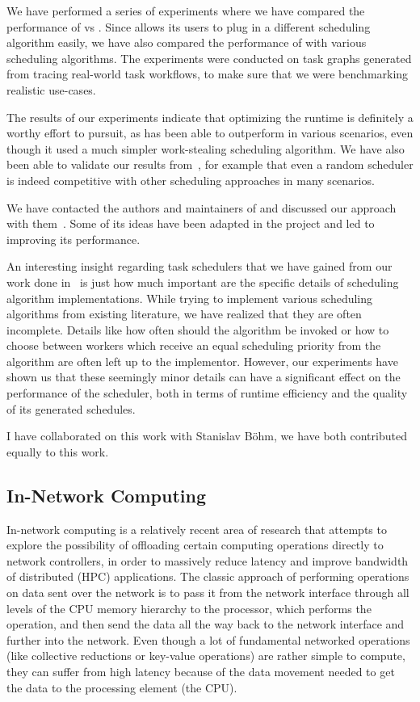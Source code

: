 We have performed a series of experiments where we have compared the performance of \rsds{} vs
\dask{}. Since \rsds{} allows its users to plug in a different scheduling algorithm easily, we
have also compared the performance of \rsds{} with various scheduling algorithms. The experiments
were conducted on task graphs generated from tracing real-world \dask{} task workflows, to make
sure that we were benchmarking realistic use-cases.

The results of our experiments indicate that optimizing the runtime is definitely a worthy effort
to pursuit, as \rsds{} has been able to outperform \dask{} in various scenarios, even though it
used a much simpler work-stealing scheduling algorithm. We have also been able to validate our
results from~\cite{estee}, for example that even a random scheduler is indeed competitive with
other scheduling approaches in many scenarios.

We have contacted the authors and maintainers of \dask{} and discussed our \rsds{} approach with
them~.
Some of its ideas have been adapted in the \dask{} project and led to improving its performance.

An interesting insight regarding task schedulers that we have gained from our work done
in~\cite{estee,rsds} is just how much important are the specific details of scheduling algorithm
implementations. While trying to implement various scheduling algorithms from existing
literature, we have realized that they are often incomplete. Details like how
often should the algorithm be invoked or how to choose between workers which receive an equal
scheduling priority from the algorithm are often left up to the implementor. However, our
experiments have shown us that these seemingly minor details can have a significant effect on
the performance of the scheduler, both in terms of runtime efficiency and the quality of its
generated schedules.

I have collaborated on this work with Stanislav Böhm, we have both contributed equally to this
work.

\subsection{In-Network Computing}
In-network computing is a relatively recent area of research that attempts to explore the
possibility of offloading certain computing operations directly to network controllers, in order
to massively reduce latency and improve bandwidth of distributed (HPC) applications. The classic
approach of performing operations on data sent over the network is to pass it from the network
interface through all levels of the CPU memory hierarchy to the processor, which performs the
operation, and then send the data all the way back to the network interface and further into the
network. Even though a lot of fundamental networked operations (like collective reductions or
key-value operations) are rather simple to compute, they can suffer from high latency because of
the data movement needed to get the data to the processing element (the CPU).

